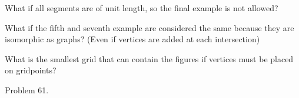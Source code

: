 \documentclass{article}
\begin{document}
\begin{related}
  \item What if all segments are of unit length, so the final example is not
    allowed?
  \item What if the fifth and seventh example are considered the same because
    they are isomorphic as graphs? (Even if vertices are added at each
    intersection)
  \item What is the smallest grid that can contain the figures if vertices
    must be placed on gridpoints?
\end{related}
\begin{references}
  \item Problem 61.
\end{references}
\end{document}

